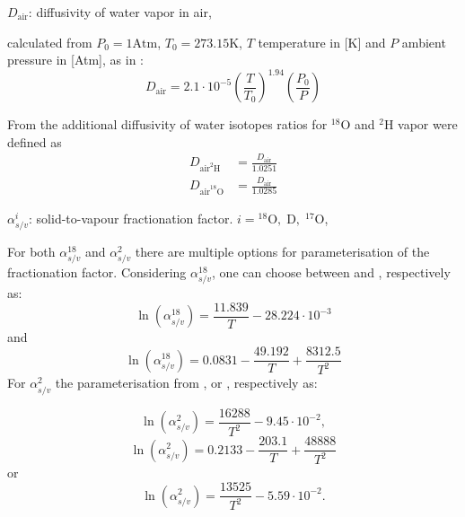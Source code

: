 \documentclass[../../CompleteThesis2/Complete_2ndDraft.tex]{subfiles}
\begin{document}
	
	$D_{\text{air}}$: diffusivity of water vapor in air,
	
	calculated from $P_0 = 1 \text{Atm}$, $T_0 = 273.15 \text{K}$, $T$ temperature in [K] and $P$ ambient pressure in [Atm], as in \cite[Hall and Prupacher, 1976]{HallPrupacher1976}:
	\begin{equation}
		D_{\text{air}} = 2.1 \cdot 10^{-5} \left(\frac{T}{T_0}\right)^{1.94}\left(\frac{P_0}{P}\right)
		\label{Eq:DiffusivAir}
	\end{equation}
	
	From \cite[Merlivat, 1978]{Merlivat1978} the additional diffusivity of water isotopes ratios for $^{18}$O and $^2$H vapor were defined as 
	\begin{align}
		D_{\text{air}^2\text{H}} &= \frac{D_{\text{air}}}{1.0251} \\
		D_{\text{air}^{18}\text{O}} &= \frac{D_{\text{air}}}{1.0285} 	
	\end{align}
	
	$\alpha_{s/v}^i$: solid-to-vapour fractionation factor. $i = {^{18}\text{O},\; \text{D}},\; ^{17}\text{O}$,
	
	For both $\alpha_{s/v}^{18}$ and $\alpha_{s/v}^{2}$ there are multiple options for parameterisation of the fractionation factor. Considering $\alpha_{s/v}^{18}$, one can choose between \cite[Majoube 1971]{Majoube1970} and \cite[Elleh\o j et al., 2013]{Ellehoj2013}, respectively as:
	\begin{equation}
		\ln(\alpha_{s/v}^{18}) = \frac{11.839}{T} - 28.224\cdot 10^{-3}
		\label{Eq:FractFact18_Majoube}
	\end{equation}
	and
	\begin{equation}
		\ln(\alpha_{s/v}^{18}) = 0.0831 - \frac{49.192}{T} + \frac{8312.5}{T^2}
		\label{Eq:FractFact18_Ellehoj}
	\end{equation}
	For $\alpha_{s/v}^{2}$ the parameterisation from \cite[Merlivat and Nief, 1967]{MerlivatNief1967}, \cite[Elleh\o j et al., 2013]{Ellehoj2013} or \cite[Lamb et al., 2017]{Lamb2017}, respectively as:
	
	\begin{equation}
		\ln(\alpha_{s/v}^{2}) = \frac{16288}{T^2} - 9.45\cdot 10^{-2},
		\label{Eq:FractFact2_Merlivat}
	\end{equation}
	\begin{equation}
		\ln(\alpha_{s/v}^{2}) = 0.2133 - \frac{203.1}{T} + \frac{48888}{T^2}
		\label{Eq:FractFact2_Ellehoj}
	\end{equation}
	or
	\begin{equation}
		\ln(\alpha_{s/v}^{2}) =  \frac{13525}{T^2} - 5.59\cdot 10^{-2}.
		\label{Eq:FractFact2_Lamb}
	\end{equation}
	
\end{document}
